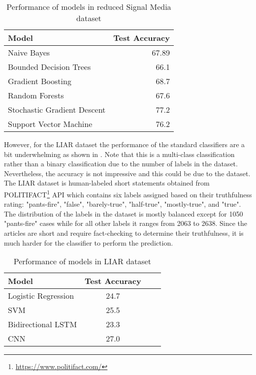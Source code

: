 \begin{table}[h]
\begin{center}
\caption{Performance of models in reduced Signal Media dataset}
\label{tbl:signal_media_performance}
\begin{tabular}{lr}
\toprule 
Model&Test Accuracy\\
\midrule 
Naive Bayes&67.89\\
Bounded Decision Trees&66.1\\
Gradient Boosting&68.7\\
Random Forests&67.6\\
Stochastic Gradient Descent&77.2\\
Support Vector Machine&76.2\\
\bottomrule
\end{tabular}
\end{center}
\end{table}

However, for the LIAR\cite{wang2017liar} dataset the performance of the standard classifiers are a bit underwhelming as shown in  \cite{wang2017liar}.  Note that this is a multi-class classification rather than a binary classification due to the number of labels in the dataset. Nevertheless, the accuracy is not impressive and this could be due to the dataset.  The LIAR dataset is human-labeled short statements obtained from POLITIFACT\footnote{\url{https://www.politifact.com/}} API which contains six labels assigned based on their truthfulness rating: "pants-fire", "false", "barely-true", "half-true", "mostly-true", and "true". The distribution of the labels in the dataset is mostly balanced except for 1050 "pants-fire" cases while for all other labels it ranges from 2063 to 2638. Since the articles are short and require fact-checking to determine their truthfulness, it is much harder for the classifier to perform the prediction.

\begin{table}[h]
\begin{center}
\caption{Performance of models in LIAR dataset}
\label{tbl:liar_performance}
\begin{tabular}{lccc}
\toprule 
Model&Test Accuracy\\
\midrule 
Logistic Regression&24.7\\
SVM&25.5\\
Bidirectional LSTM&23.3\\
CNN&27.0\\
\bottomrule
\end{tabular}
\end{center}
\end{table}


